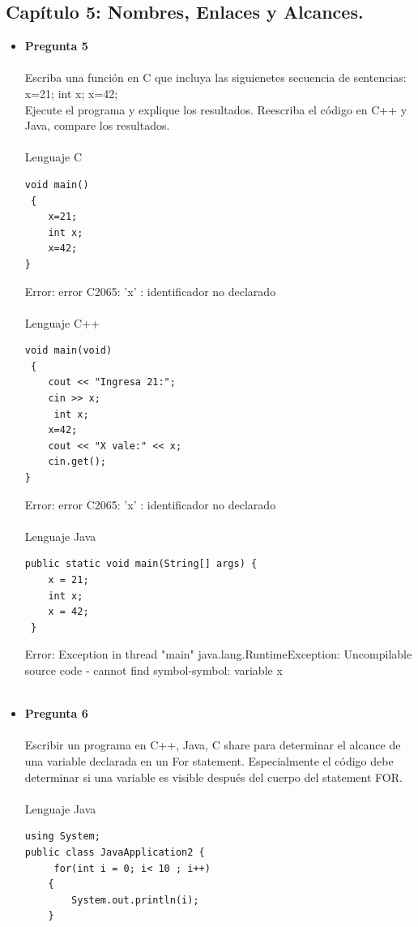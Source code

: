\documentclass[12pt,oneside]{article}
\begin{document}
\subsection{Capítulo 5: Nombres, Enlaces y Alcances.}
\begin{itemize}
\item {\bf Pregunta 5} \\\\
Escriba una función en C que incluya las siguienetes secuencia de sentencias:\\
x=21;
int x;
x=42;\\
Ejecute el programa y explique los resultados. Reescriba el código en C++ y Java, compare los resultados.\\\\
Lenguaje C\\
\begin{lstlisting}[frame=single]
void main()
 {
 	x=21;
	int x;
	x=42;
}
\end{lstlisting}
Error:  error C2065: 'x' : identificador no declarado\\\\
Lenguaje C++
\begin{lstlisting}[frame=single]
void main(void)
 {
 	cout << "Ingresa 21:";
 	cin >> x;
 	 int x;
 	x=42;
 	cout << "X vale:" << x;
 	cin.get();
}
\end{lstlisting}
Error: error C2065: 'x' : identificador no declarado \\\\
Lenguaje Java
\begin{lstlisting}[frame=single]
 public static void main(String[] args) {         
    x = 21;
    int x;
    x = 42;        
 }
\end{lstlisting}
Error: Exception in thread "main" java.lang.RuntimeException: Uncompilable source code - cannot find symbol-symbol: variable x\\\\ 

\item {\bf Pregunta 6} \\\\
Escribir un programa en C++, Java, C share para determinar el alcance de una variable declarada en un For statement. Especialmente el código debe determinar si una variable es visible después del cuerpo del statement FOR.\\\\

Lenguaje Java\\
\begin{lstlisting}[frame=single]  % Start your code-block
using System;
public class JavaApplication2 {
	 for(int i = 0; i< 10 ; i++)
	{
 		System.out.println(i);
	}
 	

\end{lstlisting}
\end{itemize}
\end{document}
